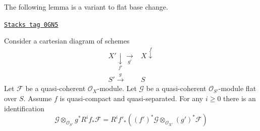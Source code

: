 The following lemma is a variant to flat base change.

\begin{lemma}
\label{coherent-lemma-base-change-tensor-with-flat}
\href{https://stacks.math.columbia.edu/tag/0GN5}{\texttt{Stacks tag 0GN5}}

Consider a cartesian diagram of schemes
$$
\begin{array}{cc}X' \underset{f'}{\downarrow}\underset{g'}{\longrightarrow} & X \overset{f}{\downarrow} \\ S' \overset{g}{\longrightarrow} & S\end{array}
$$
Let $\mathcal{F}$ be a quasi-coherent $\mathcal{O}_X$-module.
Let $\mathcal{G}$ be a quasi-coherent $\mathcal{O}_{S'}$-module
flat over $S$. Assume $f$ is quasi-compact and quasi-separated.
For any $i \geq 0$ there is an identification
$$
\mathcal{G} \otimes_{\mathcal{O}_{S'}} g^*R^if_*\mathcal{F} =
R^if'_*\left((f')^*\mathcal{G}
\otimes_{\mathcal{O}_{X'}} (g')^*\mathcal{F}\right)
$$
\end{lemma}

